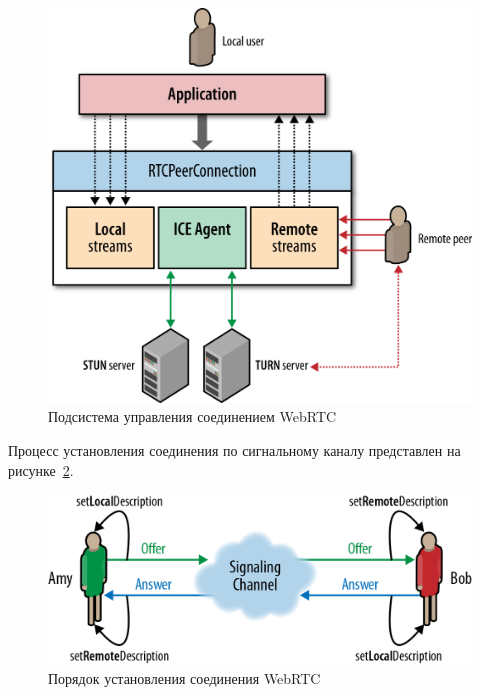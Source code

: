 \begin{figure}[h!]
  \centering
  \includegraphics[width=130mm]{pic/webrtc_ice.png}
  \caption{Подсистема управления соединением WebRTC}
  \label{pic:webrtc_ice}
\end{figure}

Процесс установления соединения по сигнальному каналу
представлен на рисунке~\ref{pic:webrtc_establish_conn}.

\begin{figure}[h!]
  \centering
  \includegraphics[width=150mm]{pic/webrtc_establish_conn.png}
  \caption{Порядок установления соединения WebRTC}
  \label{pic:webrtc_establish_conn}
\end{figure}


